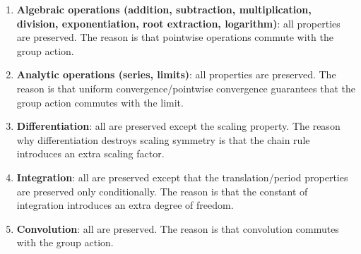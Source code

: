 \begin{theorem}\label{thm:transitivity_pattern}
\begin{enumerate}[label=(\roman*)]
    \item \textbf{Algebraic operations (addition, subtraction, multiplication, division, exponentiation, root extraction, logarithm)}: all properties are preserved. The reason is that pointwise operations commute with the group action.
    \item \textbf{Analytic operations (series, limits)}: all properties are preserved. The reason is that uniform convergence/pointwise convergence guarantees that the group action commutes with the limit.
    \item \textbf{Differentiation}: all are preserved except the scaling property. The reason why differentiation destroys scaling symmetry is that the chain rule introduces an extra scaling factor.
    \item \textbf{Integration}: all are preserved except that the translation/period properties are preserved only conditionally. The reason is that the constant of integration introduces an extra degree of freedom.
    \item \textbf{Convolution}: all are preserved. The reason is that convolution commutes with the group action.
\end{enumerate}
\end{theorem}

